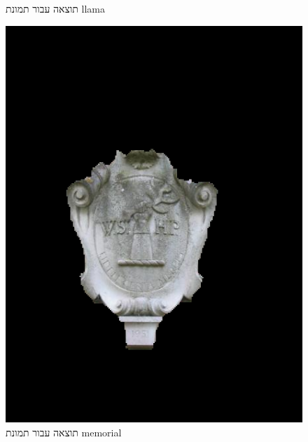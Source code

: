 \documentclass[a4paper,12pt]{article}
\begin{document}
\begin{figure}[H]
\begin{minipage}{0.3\textwidth}
        \caption{תוצאה עבור תמונת llama}
    \end{minipage}
    \hfill
    \begin{minipage}{0.3\textwidth}
        \centering
        \includegraphics[width=\textwidth]{my_reasults/final_img/memorial_result.png}
        \caption{תוצאה עבור תמונת memorial}
    \end{minipage}
\end{figure}
\end{document}
